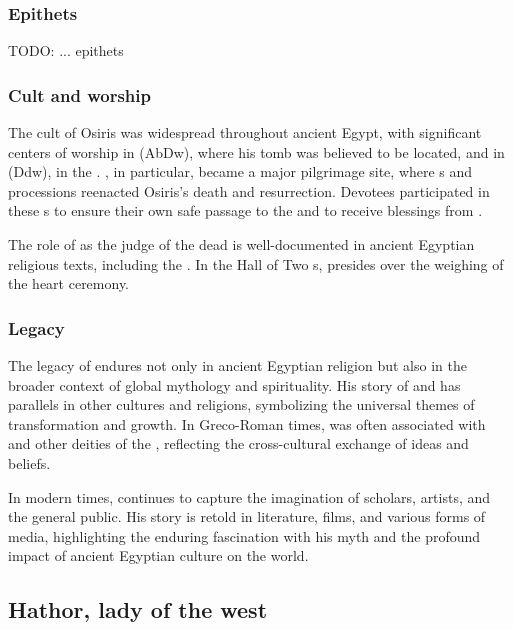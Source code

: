 \subsubsection*{Epithets}

TODO: ... epithets

\subsubsection*{Cult and worship}

The cult of Osiris was widespread throughout ancient Egypt, with significant centers of worship in  (AbDw), where his tomb was believed to be located, and in  (Ddw), in the  . , in particular, became a major pilgrimage site, where s and processions reenacted Osiris's death and resurrection. Devotees participated in these s to ensure their own safe passage to the  and to receive blessings from .

The role of  as the judge of the dead is well-documented in ancient Egyptian religious texts, including the . In the Hall of Two s,  presides over the weighing of the heart ceremony.

\subsubsection*{Legacy}

The legacy of  endures not only in ancient Egyptian religion but also in the broader context of global mythology and spirituality. His story of  and  has parallels in other cultures and religions, symbolizing the universal themes of transformation and growth. In Greco-Roman times,  was often associated with  and other deities of the , reflecting the cross-cultural exchange of ideas and beliefs.

In modern times,  continues to capture the imagination of scholars, artists, and the general public. His story is retold in literature, films, and various forms of media, highlighting the enduring fascination with his myth and the profound impact of ancient Egyptian culture on the world.

\subsection*{Hathor, lady of the west}

